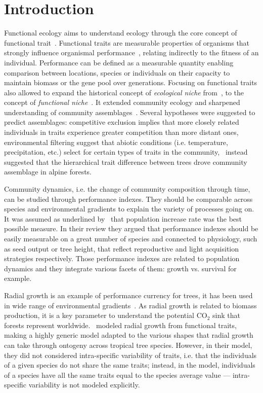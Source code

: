 \label{sec:Intro}
\section*{Introduction}

Functional ecology aims to understand ecology through the core concept of functional trait~\citep{mcgill_rebuilding_2006}. Functional traits are measurable properties of organisms that strongly influence organismal performance~\citep{mcgill_rebuilding_2006}, relating indirectly to the fitness of an individual. Performance can be defined as a measurable quantity enabling comparison between locations, species or individuals on their capacity to maintain biomass or the gene pool over generations. Focusing on functional traits also allowed to expand the historical concept of \emph{ecological niche} from~\citet{hutchinson_concluding_1957}, to the concept of \emph{functional niche}~\citep{violle_towards_2009}. It extended community ecology and sharpened understanding of community assemblages~\citep{kraft_functional_2010}. Several hypotheses were suggested to predict assemblages: competitive exclusion implies that more closely related individuals in traits experience greater competition than more distant ones, environmental filtering suggest that abiotic conditions (i.e. temperature, precipitation, etc.) select for certain types of traits in the community,~\citet{kunstler_competitive_2012} instead suggested that the hierarchical trait difference between trees drove community assemblage in alpine forests.

Community dynamics, i.e. the change of community composition through time, can be studied through performance indexes. They should be comparable across species and environmental gradients to explain the variety of processes going on. It was assumed as underlined by~\citet{mcgill_rebuilding_2006} that population increase rate was the best possible measure. In their review they argued that performance indexes should be easily measurable on a great number of species	and connected to physiology, such as seed output or tree height, that reflect reproductive and light acquisition strategies respectively. Those performance indexes are related to population dynamics and they integrate various facets of them: growth vs. survival for example.

Radial growth is an example of performance currency for trees, it has been used in wide range of environmental gradients~\citep{herault_functional_2011, kunstler_competitive_2012}. As radial growth is related to biomass production, it is a key parameter to understand the potential $\text{CO}_2$ sink that forests represent worldwide.~\citet{herault_functional_2011} modeled radial growth from functional traits, making a highly generic model adapted to the various shapes that radial growth can take through ontogeny across tropical tree species. However, in their model, they did not considered intra-specific variability of traits, i.e. that the individuals of a given species do not share the same traits; instead, in the model, individuals of a species have all the same traits equal to the species average value — intra-specific variability is not modeled explicitly.

